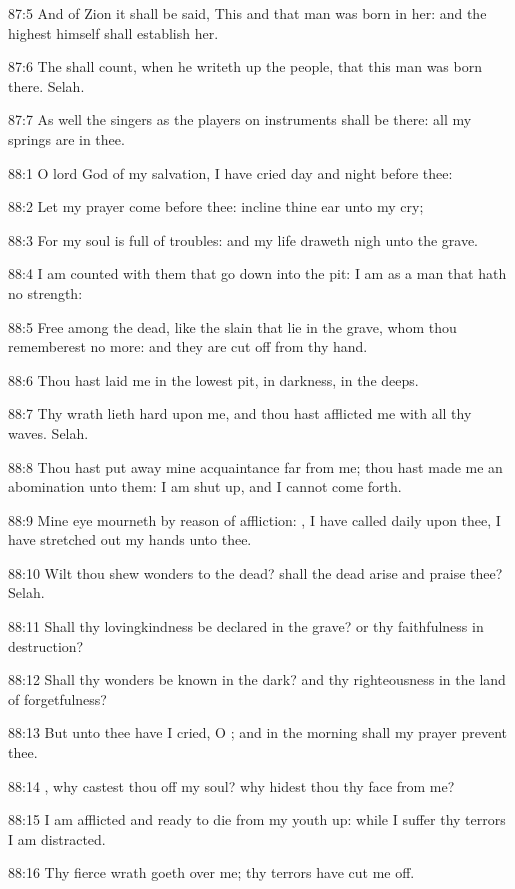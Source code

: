 87:5 And of Zion it shall be said, This and that man was born in her: and the highest himself shall establish her.

87:6 The \LORD shall count, when he writeth up the people, that this man was born there. Selah.

87:7 As well the singers as the players on instruments shall be there: all my springs are in thee.



88:1 O lord God of my salvation, I have cried day and night before thee:

88:2 Let my prayer come before thee: incline thine ear unto my cry;

88:3 For my soul is full of troubles: and my life draweth nigh unto the grave.

88:4 I am counted with them that go down into the pit: I am as a man that hath no strength:

88:5 Free among the dead, like the slain that lie in the grave, whom thou rememberest no more: and they are cut off from thy hand.

88:6 Thou hast laid me in the lowest pit, in darkness, in the deeps.

88:7 Thy wrath lieth hard upon me, and thou hast afflicted me with all thy waves. Selah.

88:8 Thou hast put away mine acquaintance far from me; thou hast made me an abomination unto them: I am shut up, and I cannot come forth.

88:9 Mine eye mourneth by reason of affliction: \LORD, I have called daily upon thee, I have stretched out my hands unto thee.

88:10 Wilt thou shew wonders to the dead? shall the dead arise and praise thee? Selah.

88:11 Shall thy lovingkindness be declared in the grave? or thy faithfulness in destruction?

88:12 Shall thy wonders be known in the dark? and thy righteousness in the land of forgetfulness?

88:13 But unto thee have I cried, O \LORD; and in the morning shall my prayer prevent thee.

88:14 \LORD, why castest thou off my soul? why hidest thou thy face from me?

88:15 I am afflicted and ready to die from my youth up: while I suffer thy terrors I am distracted.

88:16 Thy fierce wrath goeth over me; thy terrors have cut me off.

